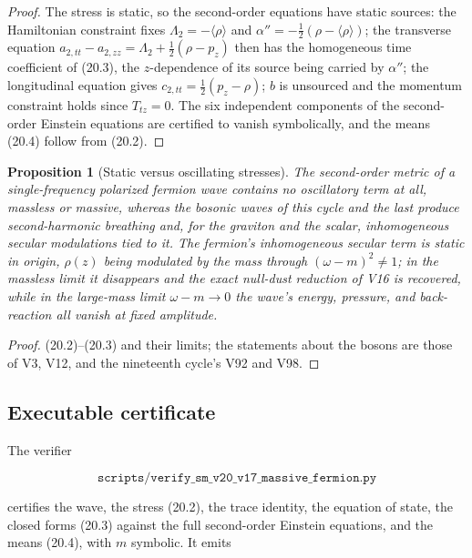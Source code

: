 \documentclass[11pt]{article}
\newtheorem{proposition}[theorem]{Proposition}
\theoremstyle{remark}
\begin{document}
\begin{proof}
The stress is static, so the second-order equations have static
sources: the Hamiltonian constraint fixes \(\Lambda_2=-\langle\rho\rangle\)
and \(\alpha''=-\tfrac12(\rho-\langle\rho\rangle)\); the transverse
equation \(a_{2,tt}-a_{2,zz}=\Lambda_2+\tfrac12(\rho-p_z)\) then has
the homogeneous time coefficient of (20.3), the \(z\)-dependence of its
source being carried by \(\alpha''\); the longitudinal equation gives
\(c_{2,tt}=\tfrac12(p_z-\rho)\); \(b\) is unsourced and the momentum
constraint holds since \(T_{tz}=0\).  The six independent components
of the second-order Einstein equations are certified to vanish
symbolically, and the means (20.4) follow from (20.2).
\end{proof}

\begin{proposition}[Static versus oscillating stresses]
\label{prop:v20v17-static}
The second-order metric of a single-frequency polarized fermion wave
contains no oscillatory term at all, massless or massive, whereas the
bosonic waves of this cycle and the last produce second-harmonic
breathing and, for the graviton and the scalar, inhomogeneous secular
modulations tied to it.  The fermion's inhomogeneous secular term is
static in origin, \(\rho(z)\) being modulated by the mass through
\((\omega-m)^2\neq1\); in the massless limit it disappears and the
exact null-dust reduction of V16 is recovered, while in the
large-mass limit \(\omega-m\to0\) the wave's energy, pressure, and
back-reaction all vanish at fixed amplitude.
\end{proposition}

\begin{proof}
(20.2)--(20.3) and their limits; the statements about the bosons are
those of V3, V12, and the nineteenth cycle's V92 and V98.
\end{proof}

\subsection{Executable certificate}

The verifier

\[
 \texttt{scripts/verify\_sm\_v20\_v17\_massive\_fermion.py}           \tag{20.5}
\]

certifies the wave, the stress (20.2), the trace identity, the
equation of state, the closed forms (20.3) against the full
second-order Einstein equations, and the means (20.4), with \(m\)
symbolic.  It emits
\end{document}
